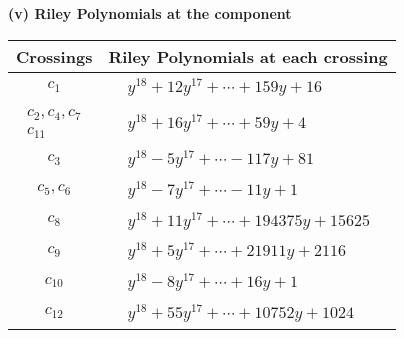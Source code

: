 \documentclass[1p]{elsarticle_modified}
\theoremstyle{definition}
\begin{document}
\newpage\renewcommand{\arraystretch}{1}
\flushleft \textbf{(v) Riley Polynomials at the component}\newline \\
\begin{tabular}{m{50pt}|m{274pt}}
Crossings & \hspace{64pt}Riley Polynomials at each crossing \\
\hline $$\begin{aligned}c_{1}\end{aligned}$$&$\begin{aligned}
&y^{18}+12 y^{17}+\cdots+159 y+16
\end{aligned}$\\
\hline $$\begin{aligned}c_{2},c_{4},c_{7}\\c_{11}\end{aligned}$$&$\begin{aligned}
&y^{18}+16 y^{17}+\cdots+59 y+4
\end{aligned}$\\
\hline $$\begin{aligned}c_{3}\end{aligned}$$&$\begin{aligned}
&y^{18}-5 y^{17}+\cdots-117 y+81
\end{aligned}$\\
\hline $$\begin{aligned}c_{5},c_{6}\end{aligned}$$&$\begin{aligned}
&y^{18}-7 y^{17}+\cdots-11 y+1
\end{aligned}$\\
\hline $$\begin{aligned}c_{8}\end{aligned}$$&$\begin{aligned}
&y^{18}+11 y^{17}+\cdots+194375 y+15625
\end{aligned}$\\
\hline $$\begin{aligned}c_{9}\end{aligned}$$&$\begin{aligned}
&y^{18}+5 y^{17}+\cdots+21911 y+2116
\end{aligned}$\\
\hline $$\begin{aligned}c_{10}\end{aligned}$$&$\begin{aligned}
&y^{18}-8 y^{17}+\cdots+16 y+1
\end{aligned}$\\
\hline $$\begin{aligned}c_{12}\end{aligned}$$&$\begin{aligned}
&y^{18}+55 y^{17}+\cdots+10752 y+1024
\end{aligned}$\\
\hline
\end{tabular}\\~\\
\end{document}
